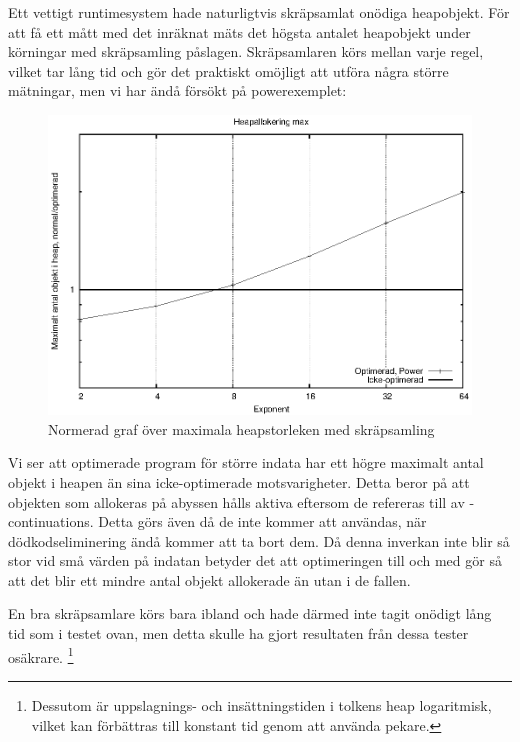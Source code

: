 \documentclass[Rapport]{subfiles}
\begin{document}
Ett vettigt runtimesystem hade naturligtvis skräpsamlat onödiga heapobjekt. För att få ett mått med det inräknat mäts det högsta antalet heapobjekt under körningar med skräpsamling påslagen.
Skräpsamlaren körs mellan varje regel, vilket tar lång tid och gör det praktiskt omöjligt att utföra några större mätningar, men vi har ändå försökt på powerexemplet:

\begin{figure}[H]
\includegraphics{maxheap.eps}
\caption{Normerad graf över maximala heapstorleken med skräpsamling}
\label{fig:Resultat:maxheap:graf}
\end{figure}

Vi ser att optimerade program för större indata har ett högre maximalt antal objekt i heapen än sina icke-optimerade motsvarigheter. Detta beror på att objekten som allokeras på abyssen hålls aktiva eftersom 
de refereras till av -continuations. Detta görs även då de inte kommer att användas, när dödkodseliminering
ändå kommer att ta bort dem. Då denna inverkan inte blir så stor vid små värden på indatan
betyder det att optimeringen till och med gör så att det blir ett mindre antal objekt allokerade än utan i de fallen.


En bra skräpsamlare körs bara ibland och hade därmed inte tagit onödigt lång tid som i testet ovan, men detta skulle ha gjort resultaten från dessa tester osäkrare. \footnote{Dessutom är uppslagnings- och insättningstiden i tolkens heap logaritmisk, vilket kan 
förbättras till konstant tid genom att använda pekare.}
\end{document}
